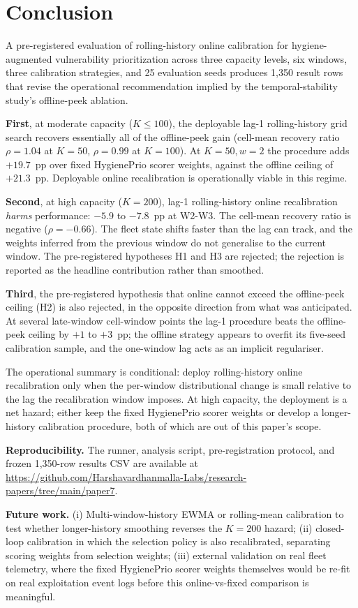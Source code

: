 \section{Conclusion}
\label{sec:conclusion}

A pre-registered evaluation of rolling-history online calibration for
hygiene-augmented vulnerability prioritization across three capacity
levels, six windows, three calibration strategies, and 25 evaluation
seeds produces 1{,}350 result rows that revise the operational
recommendation implied by the temporal-stability study's offline-peek ablation.

\textbf{First}, at moderate capacity ($K \leq 100$), the deployable
lag-1 rolling-history grid search recovers essentially all of the
offline-peek gain (cell-mean recovery ratio $\rho = 1.04$ at
$K = 50$, $\rho = 0.99$ at $K = 100$). At $K = 50, w = 2$ the procedure
adds $+19.7$~pp over fixed HygienePrio scorer weights, against the offline
ceiling of $+21.3$~pp. Deployable online recalibration is operationally
viable in this regime.

\textbf{Second}, at high capacity ($K = 200$), lag-1 rolling-history
online recalibration \textit{harms} performance: $-5.9$ to
$-7.8$~pp at W2-W3. The cell-mean recovery ratio is negative
($\rho = -0.66$). The fleet state shifts faster than the lag can
track, and the weights inferred from the previous window do not
generalise to the current window. The pre-registered hypotheses H1
and H3 are rejected; the rejection is reported as the headline
contribution rather than smoothed.

\textbf{Third}, the pre-registered hypothesis that online cannot
exceed the offline-peek ceiling (H2) is also rejected, in the
opposite direction from what was anticipated. At several late-window
cell-window points the lag-1 procedure beats the offline-peek
ceiling by $+1$ to $+3$~pp; the offline strategy appears to overfit
its five-seed calibration sample, and the one-window lag acts as
an implicit regulariser.

The operational summary is conditional: deploy rolling-history online
recalibration only when the per-window distributional change is small
relative to the lag the recalibration window imposes. At high
capacity, the deployment is a net hazard; either keep the fixed HygienePrio scorer
weights or develop a longer-history calibration procedure, both
of which are out of this paper's scope.

\textbf{Reproducibility.} The runner, analysis script, pre-registration
protocol, and frozen 1{,}350-row results CSV are available at
\url{https://github.com/Harshavardhanmalla-Labs/research-papers/tree/main/paper7}.

\textbf{Future work.} (i) Multi-window-history EWMA or rolling-mean
calibration to test whether longer-history smoothing reverses the
$K = 200$ hazard; (ii) closed-loop calibration in which the selection
policy is also recalibrated, separating scoring weights from selection
weights; (iii) external validation on real fleet telemetry, where the
fixed HygienePrio scorer weights themselves would be re-fit on real exploitation
event logs before this online-vs-fixed comparison is meaningful.
